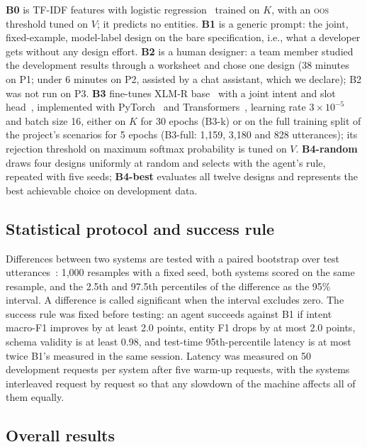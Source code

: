 \documentclass[conference]{IEEEtran}
\newcommand{\oos}{\textsc{oos}}
\begin{document}
\textbf{B0} is TF-IDF features with logistic regression~\cite{pedregosa2011scikit} trained on $K$, with an \oos{} threshold tuned on $V$; it predicts no entities. \textbf{B1} is a generic prompt: the joint, fixed-example, model-label design on the bare specification, i.e., what a developer gets without any design effort. \textbf{B2} is a human designer: a team member studied the development results through a worksheet and chose one design (38 minutes on P1; under 6 minutes on P2, assisted by a chat assistant, which we declare); B2 was not run on P3. \textbf{B3} fine-tunes XLM-R base~\cite{conneau2020unsupervised} with a joint intent and slot head~\cite{chen2019bert}, implemented with PyTorch~\cite{paszke2019pytorch} and Transformers~\cite{wolf2020transformers}, learning rate $3\times10^{-5}$ and batch size 16, either on $K$ for 30 epochs (B3-k) or on the full training split of the project's scenarios for 5 epochs (B3-full: 1{,}159, 3{,}180 and 828 utterances); its rejection threshold on maximum softmax probability is tuned on $V$. \textbf{B4-random} draws four designs uniformly at random and selects with the agent's rule, repeated with five seeds; \textbf{B4-best} evaluates all twelve designs and represents the best achievable choice on development data.

\subsection{Statistical protocol and success rule}

Differences between two systems are tested with a paired bootstrap over test utterances~\cite{koehn2004statistical}: 1{,}000 resamples with a fixed seed, both systems scored on the same resample, and the 2.5th and 97.5th percentiles of the difference as the 95\% interval. A difference is called significant when the interval excludes zero. The success rule was fixed before testing: an agent succeeds against B1 if intent macro-F1 improves by at least 2.0 points, entity F1 drops by at most 2.0 points, schema validity is at least 0.98, and test-time 95th-percentile latency is at most twice B1's measured in the same session. Latency was measured on 50 development requests per system after five warm-up requests, with the systems interleaved request by request so that any slowdown of the machine affects all of them equally.

\subsection{Overall results}
\end{document}
